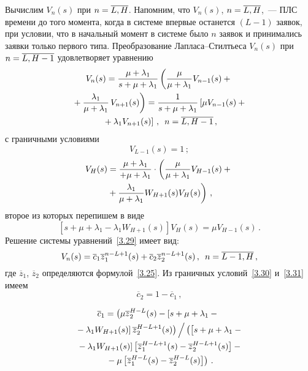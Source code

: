 \begin{multicols}{2}
Вычислим $V_n(s)$ при $n\hm=\overline{L,H}$. Напомним, что  $V_n(s)$,
$n\hm=\overline{L,H}$,~--- ПЛС времени до того момента, когда в
системе впервые останется $(L-1)$ заявок, при условии, что в
начальный момент в системе было $n$ заявок и принимались заявки
только первого типа. Преобразование Лап\-ла\-са--Стил\-ть\-еса 
$V_n(s)$ при $n\hm=\overline{L,H-1}$
удовлетворяет уравнению
\begin{multline}
\label{3.29}
V_{n}(s)
= \displaystyle\frac{\displaystyle \mu+\lambda_1\mathstrut}{\displaystyle s + \mu+\lambda_1\mathstrut}
\left(
\displaystyle\frac{\displaystyle \mu\mathstrut}{\displaystyle \mu+\lambda_1\mathstrut} V_{n-1}(s) +{}\right.\\
\left.{}+
\displaystyle\frac{\displaystyle \lambda_1 \mathstrut}{\displaystyle \mu+\lambda_1\mathstrut}\,
V_{n+1}(s)
\right) = 
\displaystyle\frac{\displaystyle 1\mathstrut}{\displaystyle s + \mu+\lambda_1\mathstrut} \left[
\mu V_{n-1}(s) +{}\right.\\
\left.{}+ \lambda_1 V_{n+1}(s)\right]
\,,\enskip  n=\overline{L,H-1}\,,
\end{multline}
с граничными условиями
\begin{equation}
\label{3.30}
V_{L-1}(s) = 1 \,;
\end{equation}
\begin{multline*}
V_{H}(s) = \displaystyle\frac{\displaystyle \mu+\lambda_1\mathstrut}{\displaystyle + \mu+\lambda_1\mathstrut}
\cdot \left( \displaystyle\frac{\displaystyle \mu \mathstrut}{\displaystyle \mu+\lambda_1\mathstrut} V_{H-1}(s)
+ {}\right.\\
\left.{}+\displaystyle\frac{\displaystyle \lambda_1 \mathstrut}{\displaystyle \mu+\lambda_1\mathstrut} W_{H+1}(s)
V_{H}(s) \right) \,,
\end{multline*}
второе из которых перепишем в виде
\begin{equation}
\label{3.31}
\left[s + \mu + \lambda_1 - \lambda_1 W_{H+1}(s)\right] V_{H}(s) = \mu V_{H-1}(s) \,.
\end{equation}
Решение системы уравнений~\eqref{3.29} имеет вид:
\begin{equation*}
V_{n}(s) = \overline{c}_1 \overline{z}_1^{n-L+1}(s)
+
\overline{c}_2 \overline{z}_2^{n-L+1}(s)\,,\enskip n=\overline{L-1,H}\,,
\end{equation*}
где $\overline{z}_1$, $\overline{z}_2$ определяются
формулой~\eqref{3.25}.
Из граничных условий~\eqref{3.30} и~\eqref{3.31} имеем
\begin{equation*}
\overline{c}_2 = 1-\overline{c}_1 \,,
\end{equation*}

\vspace*{-12pt}

\noindent
\begin{multline*}
\overline{c}_1 = \left( \mu \overline{z}_2^{H-L}(s) - 
\left[s + \mu + \lambda_1 -{}\right.\right.\\
\left.\left.{}- \lambda_1 W_{H+1}(s)\right] \overline{z}_2^{H-L+1}(s)
\right)\Big/ \left(\left[
\vphantom{\overline{z}_1^{H-L}}
s + \mu + \lambda_1 -{}\right.\right.\\
\left.\left.{}- \lambda_1 W_{H+1}(s)\right]
\left[\overline{z}_1^{H-L+1}(s) - \overline{z}_2^{H-L+1}(s)\right]-{}\right.\\
\left.{}-\mu \left[\overline{z}_1^{H-L}(s) - \overline{z}_2^{H-L}(s)\right] \right) \,.
\end{multline*}


\end{multicols}
